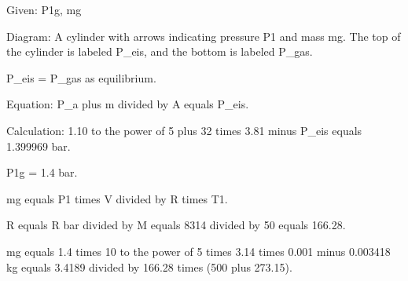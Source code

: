 Given: P1g, mg

Diagram: A cylinder with arrows indicating pressure P1 and mass mg. The top of the cylinder is labeled P_eis, and the bottom is labeled P_gas.

P_eis = P_gas as equilibrium.

Equation: 
P_a plus m divided by A equals P_eis.

Calculation:
1.10 to the power of 5 plus 32 times 3.81 minus P_eis equals 1.399969 bar.

P1g = 1.4 bar.

mg equals P1 times V divided by R times T1.

R equals R bar divided by M equals 8314 divided by 50 equals 166.28.

mg equals 1.4 times 10 to the power of 5 times 3.14 times 0.001 minus 0.003418 kg equals 3.4189 divided by 166.28 times (500 plus 273.15).